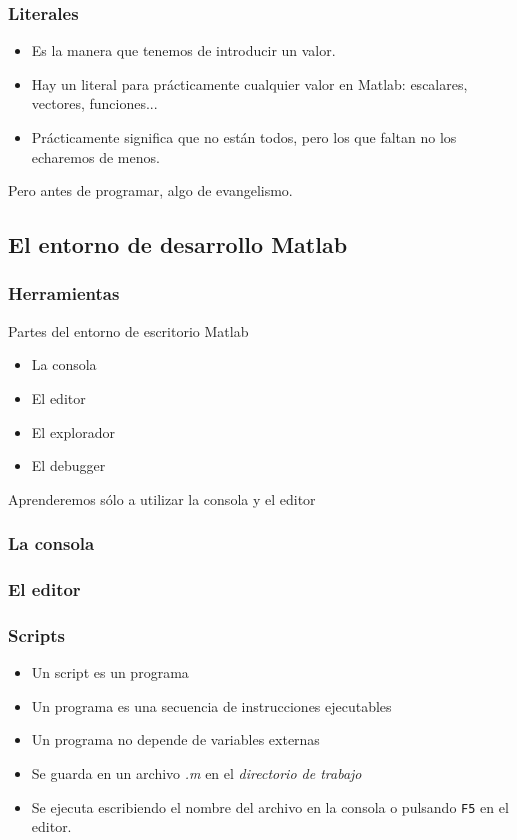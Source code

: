 \documentclass[12pt]{beamer}
\begin{document}
\begin{frame}
  \frametitle{Literales}
  \begin{itemize}
  \item Es la manera que tenemos de introducir un valor.
  \item Hay un literal para prácticamente cualquier valor en Matlab:
    escalares, vectores, funciones...
  \item Prácticamente significa que no están todos, pero los que
    faltan no los echaremos de menos.
  \end{itemize}
\pause
Pero antes de programar, algo de evangelismo.
\end{frame}

\subsection{El entorno de desarrollo Matlab}
\begin{frame}
  \frametitle{Herramientas}
Partes del entorno de escritorio Matlab
\begin{itemize}
\item La consola
\item El editor
\item El explorador
\item El debugger
\end{itemize}
Aprenderemos sólo a utilizar la consola y el editor
\end{frame}

\begin{frame}
  \frametitle{La consola}


\end{frame}

\begin{frame}
  \frametitle{El editor}
\end{frame}

\begin{frame}
\frametitle{Scripts}
\begin{itemize}
\item Un script es un programa
\item Un programa es una secuencia de instrucciones ejecutables
\item Un programa no depende de variables externas
\item Se guarda en un archivo \emph{.m} en el \emph{directorio
  de trabajo}
\item Se ejecuta escribiendo el nombre del archivo en la consola o
  pulsando \texttt{F5} en el editor.
\end{itemize}
\end{frame}
\end{document}

